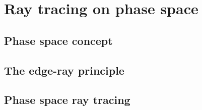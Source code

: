 \chapter{Ray tracing on phase space} \label{chap:PS}
\section{Phase space concept}
\section{The edge-ray principle}
\section{Phase space ray tracing}

